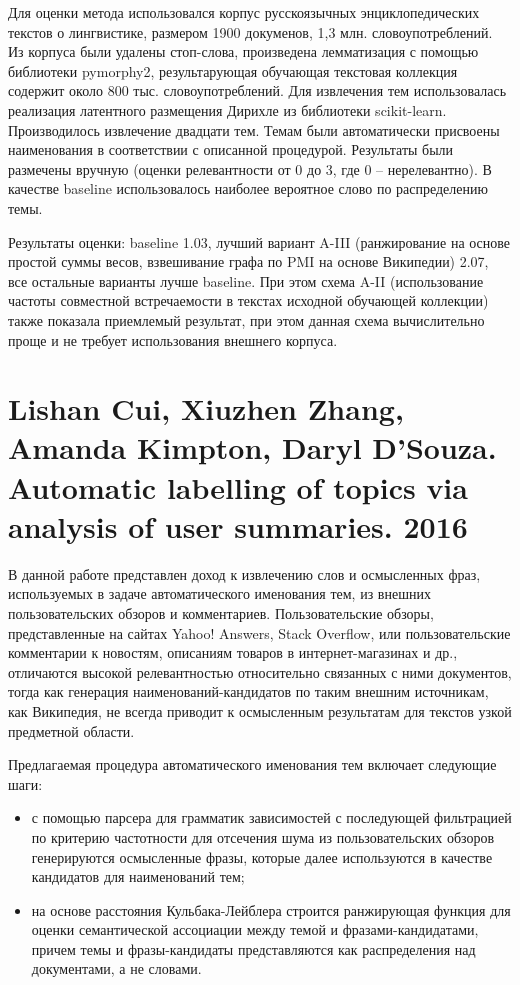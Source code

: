 Для оценки метода использовался корпус русскоязычных энциклопедических текстов о лингвистике, размером 1900 докуменов, 1,3 млн. словоупотреблений. Из корпуса были удалены стоп-слова, произведена лемматизация с помощью библиотеки pymorphy2, результарующая обучающая текстовая коллекция содержит около 800 тыс. словоупотреблений. Для извлечения тем использовалась реализация латентного размещения Дирихле из библиотеки scikit-learn. Производилось извлечение двадцати тем. Темам были автоматически присвоены наименования в соответствии с описанной процедурой. Результаты были размечены вручную (оценки релевантности от 0 до 3, где 0 -- нерелевантно). В качестве baseline использовалось наиболее вероятное слово по распределению темы. 

Результаты оценки: baseline 1.03, лучший вариант A-III (ранжирование на основе простой суммы весов, взвешивание графа по PMI на основе Википедии) 2.07, все остальные варианты лучше baseline. При этом схема A-II (использование частоты совместной встречаемости в текстах исходной обучающей коллекции) также показала приемлемый результат, при этом данная схема вычислительно проще и не требует использования внешнего корпуса. 


\section{Lishan Cui, Xiuzhen Zhang, Amanda Kimpton, Daryl D'Souza. Automatic labelling of topics via analysis of user summaries. 2016}

В данной работе представлен доход к извлечению слов и осмысленных фраз, используемых в задаче автоматического именования тем, из внешних пользовательских обзоров и комментариев. Пользовательские обзоры, представленные на сайтах Yahoo! Answers, Stack Overflow, или пользовательские комментарии к новостям, описаниям товаров в интернет-магазинах и др., отличаются высокой релевантностью относительно связанных с ними документов, тогда как генерация наименований-кандидатов по таким внешним источникам, как Википедия, не всегда приводит к осмысленным результатам для текстов узкой предметной области.

Предлагаемая процедура автоматического именования тем включает следующие шаги:
\begin{itemize}
    \item с помощью парсера для грамматик зависимостей с последующей фильтрацией по критерию частотности для отсечения шума из пользовательских обзоров генерируются осмысленные фразы, которые далее используются в качестве кандидатов для наименований тем;
    \item на основе расстояния Кульбака-Лейблера строится ранжирующая функция для оценки семантической ассоциации между темой и фразами-кандидатами, причем темы и фразы-кандидаты представляются как распределения над документами, а не словами.
\end{itemize} 

